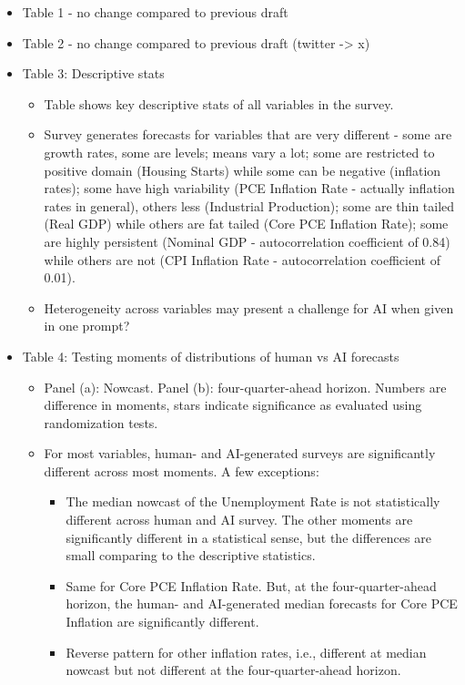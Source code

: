 \documentclass{article}
\begin{document}
\begin{itemize}
    \item Table 1 - no change compared to previous draft
    \item Table 2 - no change compared to previous draft (twitter -> x)
    \item Table 3: Descriptive stats
        \begin{itemize}
            \item Table shows key descriptive stats of all variables in the survey.
            \item Survey generates forecasts for variables that are very different - some are growth rates, some are levels; means vary a lot; some are restricted to positive domain (Housing Starts) while some can be negative (inflation rates); some have high variability (PCE Inflation Rate - actually inflation rates in general), others less (Industrial Production); some are thin tailed (Real GDP) while others are fat tailed (Core PCE Inflation Rate); some are highly persistent (Nominal GDP - autocorrelation coefficient of 0.84) while others are not (CPI Inflation Rate - autocorrelation coefficient of 0.01). 
            \item Heterogeneity across variables may present a challenge for AI when given in one prompt?
        \end{itemize}
    \item Table 4: Testing moments of distributions of human vs AI forecasts
        \begin{itemize}
            \item Panel (a): Nowcast. Panel (b): four-quarter-ahead horizon. Numbers are difference in moments, stars indicate significance as evaluated using randomization tests.
            \item For most variables, human- and AI-generated surveys are significantly different across most moments. A few exceptions: 
            \begin{itemize}
                \item The median nowcast of the Unemployment Rate is not statistically different across human and AI survey. The other moments are significantly different in a statistical sense, but the differences are small comparing to the descriptive statistics. 
                \item Same for Core PCE Inflation Rate. But, at the four-quarter-ahead horizon, the human- and AI-generated median forecasts for Core PCE Inflation are significantly different.
                \item Reverse pattern for other inflation rates, i.e., different at median nowcast but not different at the four-quarter-ahead horizon.

\end{itemize}
\end{itemize}
\end{itemize}
\end{document}
